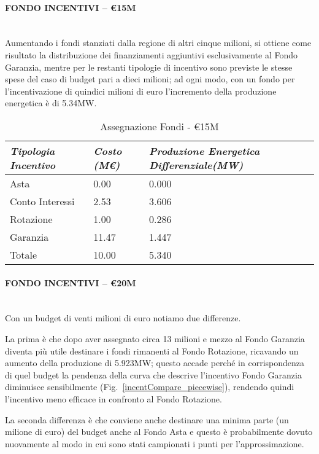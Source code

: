 \documentclass[12pt,a4paper,openright,twoside]{report}
\newcommand{\myparagraph}[1]{\paragraph{#1}\mbox{}\\}
\begin{document}
\myparagraph{FONDO INCENTIVI – \euro15M}

Aumentando i fondi stanziati dalla regione di altri cinque milioni, si ottiene come risultato la distribuzione dei finanziamenti aggiuntivi esclusivamente al Fondo Garanzia, mentre per le restanti tipologie di incentivo sono previste le stesse spese del caso di budget pari a dieci milioni; ad ogni modo, con un fondo per l'incentivazione di quindici milioni di euro l'incremento della produzione energetica è di 5.34MW.

\begin{table}[h]
\centering
	\begin{tabular}{ p{}  | p{} | p{}  }
		\hline \hline 
		\nohyphens{\emph{Tipologia Incentivo}} & \nohyphens{\emph{Costo (M\euro)}} & \nohyphens{\emph{Produzione Energetica Differenziale(MW)}} \\ \hline
		Asta &  0.00 & 0.000 \\ 
		Conto Interessi & 2.53 & 3.606 \\ 
		Rotazione & 1.00 & 0.286 \\ 
		Garanzia & 11.47 & 1.447 \\ \hline 
		Totale & 10.00 & 5.340 \\
		\hline \hline 
	\end{tabular}
	\caption{Assegnazione Fondi - \euro15M}
	\label{tab:assegnFondi15M}	
\end{table}

\myparagraph{FONDO INCENTIVI – \euro20M}

Con un budget di venti milioni di euro notiamo due differenze. 

La prima è che dopo aver assegnato circa 13 milioni e mezzo al Fondo Garanzia diventa più utile destinare i fondi rimanenti al Fondo Rotazione, ricavando un aumento della produzione di 5.923MW; questo accade perché in corrispondenza di quel budget la pendenza della curva che descrive l'incentivo Fondo Garanzia diminuisce sensibilmente (Fig.~\ref{incentCompare_piecewise}), rendendo quindi l'incentivo meno efficace in confronto al Fondo Rotazione.

La seconda differenza è che conviene anche destinare una minima parte (un milione di euro) del budget anche al Fondo Asta e questo è probabilmente dovuto nuovamente al modo in cui sono stati campionati i punti per l'approssimazione.
\end{document}
